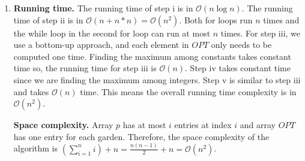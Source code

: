 \documentclass{article}
\begin{document}
\begin{enumerate}
\begin{enumerate}
        \item \textbf{Running time.} The running time of step i is in $\mathcal{O}(n\log n)$. The running time of step ii is in $\mathcal{O}(n + n*n) = \mathcal{O}(n^2)$. Both for loops run $n$ times and the while loop in the second for loop can run at most $n$ times. For step iii, we use a bottom-up approach, and each element in $OPT$ only needs to be computed one time. Finding the maximum among constants takes constant time so, the running time for step iii is $\mathcal{O}(n)$. Step iv takes constant time since we are finding the maximum among integers. Step v is similar to step iii and takes $\mathcal{O}(n)$ time. This means the overall running time complexity is in $\mathcal{O}(n^2)$.
        
        \textbf{Space complexity.} Array $p$ has at most $i$ entries at index $i$ and array $OPT$ has one entry for each garden. Therefore, the space complexity of the algorithm is $(\sum^n_{i=1} i) + n = \frac{n(n-1)}{2} + n = \mathcal{O}(n^2)$.
     \end{enumerate}
    

\end{enumerate}
\end{document}
